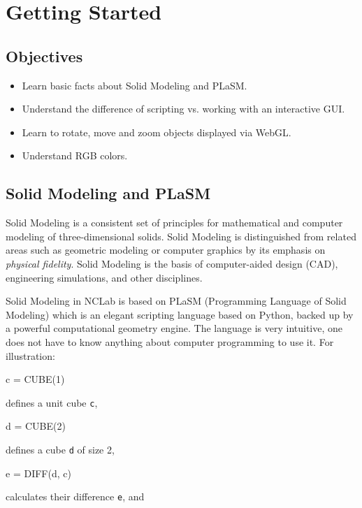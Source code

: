
\pagestyle{plain}
\setcounter{page}{1}

\section{Getting Started}

\subsection{Objectives}
\begin{itemize}
\item Learn basic facts about Solid Modeling and PLaSM.
\item Understand the difference of scripting vs. working with an interactive GUI.
\item Learn to rotate, move and zoom objects displayed via WebGL.
\item Understand RGB colors.
\end{itemize}

\subsection{Solid Modeling and PLaSM}

Solid Modeling is a consistent set of principles for mathematical and computer 
modeling of three-dimensional solids. Solid Modeling is distinguished from related 
areas such as geometric modeling or computer graphics by its emphasis on {\em physical fidelity}.
Solid Modeling is the basis of computer-aided design (CAD), engineering simulations, and other disciplines.

Solid Modeling in NCLab is based on PLaSM (Programming Language 
of Solid Modeling) which is an elegant scripting language based on 
Python, backed up by a powerful computational geometry 
engine. The language is very intuitive, one does not have to know 
anything about computer programming to use it. For illustration:

\begin{bluecode}
c = CUBE(1)
\end{bluecode}
\noindent
defines a unit cube {\tt c}, 

\begin{bluecode}
d = CUBE(2)
\end{bluecode}
\noindent
defines a cube {\tt d} of size 2,

\begin{bluecode}
e = DIFF(d, c)
\end{bluecode}
calculates their difference {\tt e}, and


